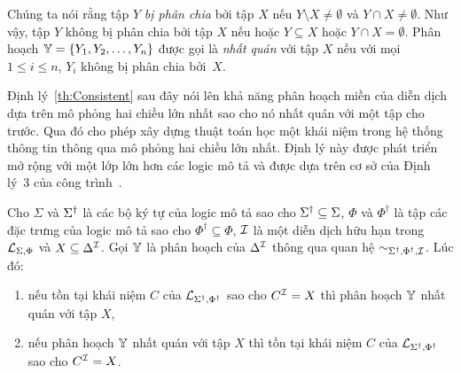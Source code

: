 Chúng ta nói rằng tập $Y$ {\em bị phân chia} bởi tập $X$ nếu $Y \setminus X \neq \emptyset$ và $Y \cap X \neq \emptyset$. Như vậy, tập $Y$ không bị phân chia bởi tập $X$ nếu hoặc $Y \subseteq X$ hoặc $Y \cap X = \emptyset$.
Phân hoạch $\mathbb{Y} = \{Y_1, Y_2, \ldots,Y_n\}$ được gọi là {\em nhất quán} với tập $X$ nếu với mọi $1 \leq i \leq n$, $Y_i$ không bị phân chia bởi~$X$.

Định lý~\ref{th:Consistent} sau đây nói lên khả năng phân hoạch miền của diễn dịch dựa trên mô phỏng hai chiều lớn nhất sao cho nó nhất quán với một tập cho trước. Qua đó cho phép xây dựng thuật toán học một khái niệm trong hệ thống thông tin thông qua mô phỏng hai chiều lớn nhất. Định lý này được phát triển mở rộng với một lớp lớn hơn các logic mô tả và được dựa trên cơ sở của Định lý~3 của công trình~\cite{Nguyen2013}.

\begin{Theorem}
\label{th:Consistent}
Cho $\Sigma$ và $\Sigma^\dag$ là các bộ ký tự của logic mô tả sao cho $\Sigma^\dag \subseteq \Sigma$, $\Phi$ và $\Phi^\dag$ là tập các đặc trưng của logic mô tả sao cho $\Phi^\dag \subseteq \Phi$, $\mathcal{I}$ là một diễn dịch hữu hạn trong $\mathcal{L}_{\Sigma,\Phi}$ và $X \subseteq \Delta^{\mathcal{I}}$. Gọi $\mathbb{Y}$ là phân hoạch của $\Delta^{\mathcal{I}}$ thông qua quan hệ $\sim_{\Sigma^\dag,\Phi^\dag,\mathcal{I}}$. Lúc đó:
\begin{enumerate}
  \item nếu tồn tại khái niệm $C$ của $\mathcal{L}_{\Sigma^\dag,\Phi^\dag}$ sao cho $C^{\mathcal{I}} = X$ thì phân hoạch $\mathbb{Y}$ nhất quán với tập $X$,  
  \item nếu phân hoạch $\mathbb{Y}$ nhất quán với tập $X$ thì tồn tại khái niệm $C$ của $\mathcal{L}_{\Sigma^\dag,\Phi^\dag}$ sao cho $C^{\mathcal{I}} = X$.
\end{enumerate}
\end{Theorem}


